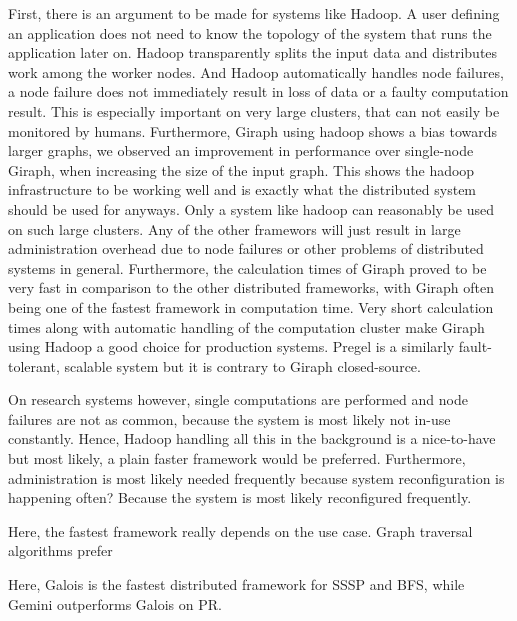 First, there is an argument to be made for systems like Hadoop.
A user defining an application does not need to know the topology of the system that runs the application later on.
Hadoop transparently splits the input data and distributes work among the worker nodes.
And Hadoop automatically handles node failures, a node failure does not immediately result in loss of data or a faulty computation result.
This is especially important on very large clusters, that can not easily be monitored by humans.
Furthermore, Giraph using hadoop shows a bias towards larger graphs, we observed an improvement in performance over single-node Giraph, when increasing the size of the input graph.
This shows the hadoop infrastructure to be working well and is exactly what the distributed system should be used for anyways. 
Only a system like hadoop can reasonably be used on such large clusters.
Any of the other framewors will just result in large administration overhead due to node failures or other problems of distributed systems in general.
Furthermore, the calculation times of Giraph proved to be very fast in comparison to the other distributed frameworks, with Giraph often being one of the fastest framework in computation time.
Very short calculation times along with automatic handling of the computation cluster make Giraph using Hadoop a good choice for production systems.
Pregel is a similarly fault-tolerant, scalable system but it is contrary to Giraph closed-source.

On research systems however, single computations are performed and node failures are not as common, because the system is most likely not in-use constantly.
Hence, Hadoop handling all this in the background is a nice-to-have but most likely, a plain faster framework would be preferred.
Furthermore, administration is most likely needed frequently because system reconfiguration is happening often?
Because the system is most likely reconfigured frequently.

Here, the fastest framework really depends on the use case. Graph traversal algorithms prefer

Here, Galois is the fastest distributed framework for SSSP and BFS, while Gemini outperforms Galois on PR.












